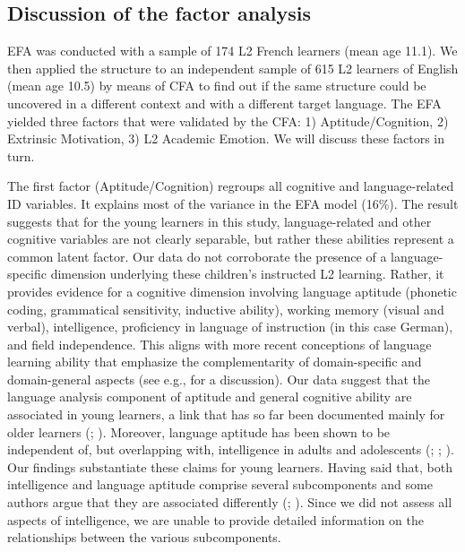 \documentclass[output=paper]{langsci/langscibook}
\begin{document}
\subsection{Discussion of the factor analysis}\label{sec:03:3.3}

EFA was conducted with a sample of 174 L2 French learners (mean age 11.1). We then applied the structure to an independent sample of 615 L2 learners of English (mean age 10.5) by means of CFA to find out if the same structure could be uncovered in a different context and with a different target language. The EFA yielded three factors that were validated by the CFA: 1) Aptitude/Cognition, 2) Extrinsic Motivation, 3) L2 Academic Emotion. We will discuss these factors in turn.

The first factor (Aptitude/Cognition) regroups all cognitive and language-re\-lat\-ed ID variables. It explains most of the variance in the EFA model (16\%). The result suggests that for the young learners in this study, language-re\-lat\-ed and other cognitive variables are not clearly separable, but rather these abilities represent a common latent factor. Our data do not corroborate the presence of a language-specific dimension underlying these children’s instructed L2 learning. Rather, it provides evidence for a cognitive dimension involving language aptitude (phonetic coding, grammatical sensitivity, inductive ability), working memory (visual and verbal), intelligence, proficiency in language of instruction (in this case German), and field independence. This aligns with more recent conceptions of language learning ability that emphasize the complementarity of domain-specific and domain-general aspects (see e.g., \citealt{Skehan2019} for a discussion). Our data suggest that the language analysis component of aptitude and general cognitive ability are associated in young learners, a link that has so far been documented mainly for older learners (\citealt{Granena2012,Granena2012}; \citealt{Sasaki1996}). Moreover, language aptitude has been shown to be independent of, but overlapping with, intelligence in adults and adolescents (\citealt{WescheEtAl1982}; \citealt{Sasaki1996}; \citealt[827]{Li2016}). Our findings substantiate these claims for young learners. Having said that, both intelligence and language aptitude comprise several subcomponents and some authors argue that they are associated differently (\citealt{Granena2013}; \citealt{Li2016}). Since we did not assess all aspects of intelligence, we are unable to provide detailed information on the relationships between the various subcomponents.
\end{document}
